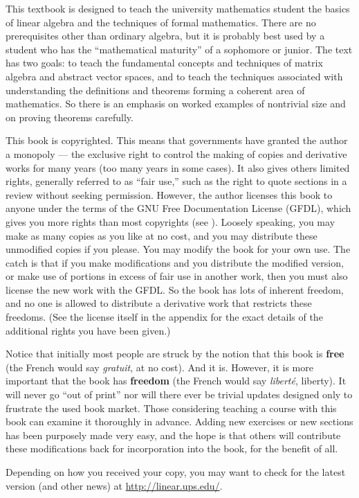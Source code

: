 %
This textbook is designed to teach the university mathematics student the basics of linear algebra and the techniques of formal mathematics.  There are no prerequisites other than ordinary algebra, but it is probably best used by a student who has the ``mathematical maturity'' of a sophomore or junior.   The text has two goals:  to teach the fundamental concepts and techniques of matrix algebra and abstract vector spaces, and to teach the techniques associated with understanding the definitions and theorems forming a coherent area of mathematics.  So there is an emphasis on worked examples of nontrivial size and on proving theorems carefully.\par
%
This book is copyrighted.  This means that governments have granted the author a monopoly --- the exclusive right to control the making of copies and derivative works for many years (too many years in some cases).  It also gives others limited rights, generally referred to as ``fair use,'' such as the right to quote sections in a review without seeking permission.  However, the author licenses this book to anyone under the terms of the GNU Free Documentation License (GFDL), which gives you more rights than most copyrights  (see ).  Loosely speaking, you may make as many copies as you like at no cost, and you may distribute these unmodified copies if you please.  You may modify the book for your own use.  The catch is that if you make modifications and you distribute the modified version, or make use of portions in excess of fair use in another work, then you must also license the new work with the GFDL.  So the book has lots of inherent freedom, and no one is allowed to distribute a derivative work that restricts these freedoms.  (See the license itself in the appendix for the exact details of the additional rights you have been given.)\par
%
Notice that initially most people are struck by the notion that this book is {\bf free} (the French would say {\it gratuit}, at no cost).  And it is.  However, it is more important that the book has {\bf freedom} (the French would say {\it libert\'{e}}, liberty).  It will never go ``out of print'' nor will there ever be trivial updates designed only to frustrate the used book market.  Those considering teaching a course with this book can examine it thoroughly in advance.
Adding new exercises or new sections has been purposely made very easy, and the hope is that others will contribute these modifications back for incorporation into the book, for the benefit of all.\par
%
Depending on how you received your copy, you may want to check for the latest version (and other news) at \url{http://linear.ups.edu/}.
%
